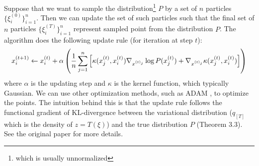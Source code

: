 Suppose that we want to sample the distribution\footnote{which is usually unnormalized} $P$ by a set of $n$ particles $\{\xi^{(0)}_i\}^n_{i=1}$. Then we can update the set of such particles such that the final set of $n$ particles $\{\xi^{(T)}_i\}^n_{i=1}$ represent sampled point from the distribution $P$. The algorithm does the following update rule (for iteration at step $t$): 
\begin{equation}
    x^{(t+1)}_i \leftarrow x^{(t)}_i + \alpha \left( \frac{1}{n}\sum^n_{j=1} \left[ \kappa(x^{(t)}_j, x^{(t)}_i) \nabla_{x^{(t)_j}} \log P(x^{(t)}_j) + \nabla_{x^{(t)_j}} \kappa (x^{(t)}_j, x^{(t)}_i)  \right] \right)
\end{equation}
where $\alpha$ is the updating step and $\kappa$ is the kernel function, which typically Gaussian. We can use other optimization methods, such as ADAM \cite{kingma2014adam}, to optimize the points. The intuition behind this is that the update rule follows the functional gradient of KL-divergence between the variational distribution ($q_{[T]}$ which is the density of $z = T(\xi)$) and the true distribution $P$ (Theorem 3.3). See the original paper for more details.


